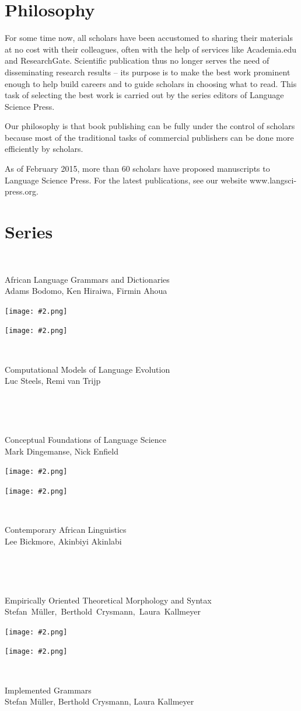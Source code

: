 \documentclass[
notumble,
nofoldmark,
]{leaflet}
\begin{document}
 \section{\sffamily\Large Philosophy}
 \parbox{\textwidth}{
 For some time now, all scholars have been accustomed to sharing their materials at no cost with their colleagues, often with the help of services like Academia.edu and ResearchGate. Scientific publication thus no longer serves the need of disseminating research results -- its purpose is to make the best work prominent enough to help build careers and to guide scholars in choosing what to read. This task of selecting the best work is carried out by the series editors of Language Science Press.

 Our philosophy is that book publishing can be fully under the control of scholars because most of the traditional tasks of commercial publishers can be done more efficiently by scholars. 
 
As of February 2015, more than 60 scholars have proposed manuscripts to Language Science Press. For the latest publications, see our website www.langsci-press.org.
 }
\newpage 

\section{\sffamily\Large Series}

\newcommand{\leftseries}[3]{   
  \parbox{.1\textwidth}{~}
  \parbox{.7\textwidth}{\raggedleft\small #1\\{\scriptsize #3}}
  \parbox{.1\textwidth}{\texttt{[image: \#2.png]}} 
}

\newcommand{\rightseries}[3]{   
  \parbox{.1\textwidth}{\texttt{[image: \#2.png]}}
  \parbox{.01\textwidth}{~} 
  \parbox{.7\textwidth}{\raggedright\small #1\\{\scriptsize #3}}
  \parbox{.05\textwidth}{~} 
}

\leftseries{African Language Grammars and Dictionaries}{algad}{Adams Bodomo, Ken Hiraiwa, Firmin Ahoua}
\rightseries{Computational Models of Language Evolution}{cmle}{Luc Steels, Remi van Trijp}

\leftseries{Conceptual Foundations of Language Science}{cfls}{Mark Dingemanse, Nick Enfield}
\rightseries{Contemporary African Linguistics}{cal}{Lee Bickmore, Akinbiyi Akinlabi}

\leftseries{Empirically Oriented Theoretical Morphology and Syntax}{eotms}{\mbox{Stefan M\"uller, Berthold Crysmann, Laura Kallmeyer}}
\rightseries{Implemented Grammars}{eotms-ig}{Stefan M\"uller, Berthold Crysmann, Laura Kallmeyer}
\end{document}
